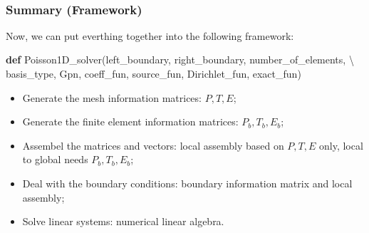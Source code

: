\documentclass[11pt]{article}
\providecommand{\tightlist}{%
      \setlength{\itemsep}{0pt}\setlength{\parskip}{0pt}}
\newenvironment{Shaded}{}{}
\newcommand{\KeywordTok}[1]{\textcolor[rgb]{0.00,0.44,0.13}{\textbf{{#1}}}}
\newcommand{\NormalTok}[1]{{#1}}
\newcommand{\OperatorTok}[1]{\textcolor[rgb]{0.40,0.40,0.40}{{#1}}}
\begin{document}
    \begin{center}
    \end{center}
    { \hspace*{\fill} \\}
    
    \subsubsection{Summary (Framework)}\label{summary-framework}

Now, we can put everthing together into the following framework:

\begin{Shaded}
\begin{Highlighting}[]
\KeywordTok{def}\NormalTok{ Poisson1D_solver(left_boundary, right_boundary, number_of_elements, }\OperatorTok{\textbackslash{}}
\NormalTok{        basis_type, Gpn, coeff_fun, source_fun, Dirichlet_fun, exact_fun)}
\end{Highlighting}
\end{Shaded}

\begin{itemize}
\tightlist
\item
  Generate the mesh information matrices: \(P, T, E\);
\item
  Generate the finite element information matrices: \(P_b, T_b, E_b\);
\item
  Assembel the matrices and vectors: local assembly based on \(P, T, E\)
  only, local to global needs \(P_b, T_b, E_b\);
\item
  Deal with the boundary conditions: boundary information matrix and
  local assembly;
\item
  Solve linear systems: numerical linear algebra.
\end{itemize}
\end{document}
